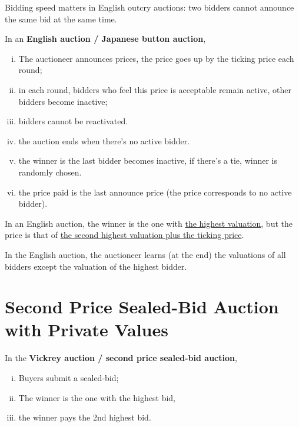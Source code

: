\documentclass{article}
\begin{document}
	\begin{remark}
		Bidding speed matters in English outcry auctions: two bidders cannot announce the same bid at the same time. 
	\end{remark}
	
	\begin{definition}
		In an \textbf{English auction / Japanese button auction},
		\begin{enumerate}[(i)]
			\item The auctioneer announces prices, the price goes up by the ticking price each round;
			\item in each round, bidders who feel this price is acceptable remain active, other bidders become inactive;
			\item bidders cannot be reactivated.
			\item the auction ends when there's no active bidder.
			\item the winner is the last bidder becomes inactive, if there's a tie, winner is randomly chosen.
			\item the price paid is the last announce price (the price corresponds to no active bidder).
		\end{enumerate}
	\end{definition}
	
	\begin{remark}
		In an English auction, the winner is the one with \ul{the highest valuation}, but the price is that of \ul{the second highest valuation plus the ticking price}.
	\end{remark}
	
	\begin{remark}
		In the English auction, the auctioneer learns (at the end) the valuations of all bidders except the valuation of the highest bidder.
	\end{remark}

	\section{Second Price Sealed-Bid Auction with Private Values}
	\begin{definition}
		In the \textbf{Vickrey auction / second price sealed-bid auction},
		\begin{enumerate}[(i)]
			\item Buyers submit a sealed-bid;
			\item The winner is the one with the highest bid,
			\item the winner pays the 2nd highest bid.
		\end{enumerate}
	\end{definition}
	
\end{document}
